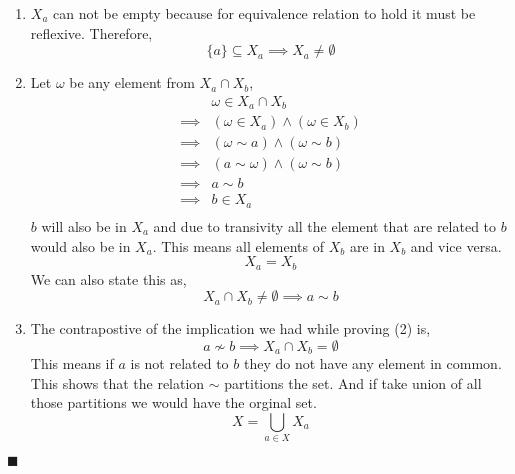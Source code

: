 \documentclass{exam}
\theoremstyle{mytheoremstyle}
\theoremstyle{mytheoremstyle}
\theoremstyle{myproblemstyle}
\begin{document}
\begin{questions}
\begin{parts}
        \begin{solution}
            \begin{enumerate}
                \item \(X_{a}\) can not be empty because for equivalence relation to hold it must be reflexive. Therefore,
                      \[\{a\}\subseteq X_{a}\implies X_{a}\neq\emptyset\]
                \item Let \(\omega\) be any element from \(X_{a}\cap X_{b}\),
                      \begin{align*}
                                   & \omega\in X_{a}\cap X_{b}                \\
                          \implies & (\omega\in X_{a})\land (\omega\in X_{b}) \\
                          \implies & (\omega\sim a) \land (\omega\sim b)      \\
                          \implies & (a\sim \omega) \land (\omega\sim b)      \\
                          \implies & a\sim b
                          \\
                          \implies & b\in X_{a}                               \\
                      \end{align*}
                      \(b\) will also be in \(X_{a}\) and due to transivity all the element that are related to \(b\) would also be in \(X_{a}\). This means all elements of \(X_{b}\) are in \(X_{b}\) and vice versa.
                      \[X_{a}=X_{b}\]
                      We can also state this as,
                      \[X_{a}\cap X_{b}\neq\emptyset\implies a\sim b\]
                \item The contrapostive of the implication we had while proving (2) is,
                      \[a\nsim b \implies X_{a}\cap X_{b}=\emptyset\]
                      This means if \(a\) is not related to \(b\) they do not have any element in common. This shows that the relation \(\sim\) partitions the set. And if take union of all those partitions we would have the orginal set.
                      \[X=\bigcup_{a\in X}X_{a}\]
            \end{enumerate}
            \center \(\blacksquare\)
        \end{solution}
    \end{parts}
\end{questions}
\end{document}
